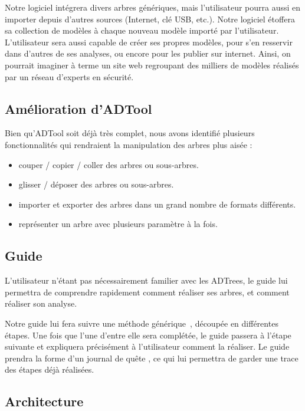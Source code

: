         Notre logiciel intégrera divers arbres génériques, mais l'utilisateur pourra aussi en importer depuis d'autres sources (Internet, clé USB, etc.). Notre logiciel étoffera sa collection de modèles à chaque nouveau modèle importé par l'utilisateur. L'utilisateur sera aussi capable de créer ses propres modèles, pour s'en resservir dans d'autres de ses analyses, ou encore pour les publier sur internet. Ainsi, on pourrait imaginer à terme un site web regroupant des milliers de modèles réalisés par un réseau d'experts en sécurité.

    \subsection{Amélioration d'ADTool}
        \label{sec:adtoolpp}

        Bien qu'ADTool soit déjà très complet, nous avons identifié plusieurs fonctionnalités qui rendraient la manipulation des arbres plus aisée :
        \begin{itemize}
            \item couper / copier / coller des arbres ou sous-arbres.
            \item glisser / déposer des arbres ou sous-arbres.
            \item importer et exporter des arbres dans un grand nombre de formats différents.
            \item représenter un arbre avec plusieurs paramètre à la fois.
        \end{itemize}

    \subsection{Guide}
        \label{sec:guide}

        L'utilisateur n'étant pas nécessairement familier avec les ADTrees, le guide lui permettra de comprendre rapidement comment réaliser ses arbres, et comment réaliser son analyse.

        Notre guide lui fera suivre une méthode générique~\cite{methode_analyse}, découpée en différentes étapes. Une fois que l'une d'entre elle sera complétée, le guide passera à l'étape suivante et expliquera précisément à l'utilisateur comment la réaliser. Le guide prendra la forme d'un \og journal de quête \fg, ce qui lui permettra de garder une trace des étapes déjà réalisées.

    \subsection{Architecture}
        \label{sec:archi}

